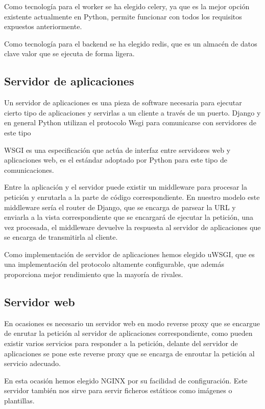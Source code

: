 \documentclass[12pt,a4paperpaper,]{report}
\begin{document}
Como tecnología para el worker se ha elegido celery, ya que es la mejor
opción existente actualmente en Python, permite funcionar con todos los
requisitos expuestos anteriormente.

Como tecnología para el backend se ha elegido redis, que es un almacén
de datos clave valor que se ejecuta de forma ligera.

\subsection{Servidor de aplicaciones}\label{servidor-de-aplicaciones}

Un servidor de aplicaciones es una pieza de software necesaria para
ejecutar cierto tipo de aplicaciones y servirlas a un cliente a través
de un puerto. Django y en general Python utilizan el protocolo Wsgi para
comunicarse con servidores de este tipo

WSGI es una especificación que actúa de interfaz entre servidores web y
aplicaciones web, es el estándar adoptado por Python para este tipo de
comunicaciones.

Entre la aplicación y el servidor puede existir un middleware para
procesar la petición y enrutarla a la parte de código correspondiente.
En nuestro modelo este middleware sería el router de Django, que se
encarga de parsear la URL y enviarla a la vista correspondiente que se
encargará de ejecutar la petición, una vez procesada, el middleware
devuelve la respuesta al servidor de aplicaciones que se encarga de
transmitirla al cliente.

Como implementación de servidor de aplicaciones hemos elegido uWSGI, que
es una implementación del protocolo altamente configurable, que además
proporciona mejor rendimiento que la mayoría de rivales.

\subsection{Servidor web}\label{servidor-web}

En ocasiones es necesario un servidor web en modo reverse proxy que se
encargue de enrutar la petición al servidor de aplicaciones
correspondiente, como pueden existir varios servicios para responder a
la petición, delante del servidor de aplicaciones se pone este reverse
proxy que se encarga de enroutar la petición al servicio adecuado.

En esta ocasión hemos elegido NGINX por su facilidad de configuración.
Este servidor también nos sirve para servir ficheros estáticos como
imágenes o plantillas.
\end{document}
